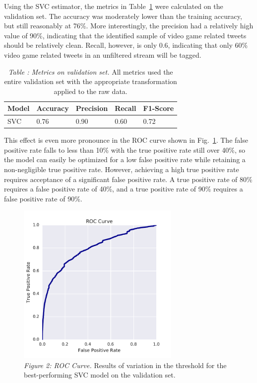 \documentclass[11pt]{revtex4-1}
\newcommand{\figref}[1]{Fig.~\ref{fig:#1}}
\newcommand{\tableref}[1]{Table~\ref{table:#1}}
\begin{document}
Using the SVC estimator, the metrics in \tableref{validation} were
calculated on the validation set.  The accuracy was moderately lower
than the training accuracy, but still reasonably at 76\%.  More
interestingly, the precision had a relatively high value of 90\%,
indicating that the identified sample of video game related tweets
should be relatively clean.  Recall, however, is only 0.6, indicating
that only 60\% video game related tweets in an unfiltered stream will
be tagged.   

\begin{table}
      \begin{tabular}{|l|l|l|l|l|}
        \hline
        Model & Accuracy & Precision & Recall & F1-Score \\
        \hline
        SVC & 0.76 & 0.90 & 0.60 & 0.72 \\
        \hline
      \end{tabular}
    \label{table:validation}
    \caption{\emph{Table : Metrics on validation set.}  All metrics
      used the entire validation set with the appropriate
      transformation applied to the raw data.}
\end{table}

This effect is even more pronounce in the ROC curve shown in
\figref{roc_curve}.  The false positive rate falls to less than 10\%
with the true positive rate still over 40\%, so the model can easily
be optimized for a low false positive rate while retaining a
non-negligible true positive rate.  However, achieving a high true
positive rate requires acceptance of a significant false positive
rate.  A true positive rate of 80\% requires a false positive rate of
40\%, and a true positive rate of 90\% requires a false positive rate
of 90\%.

\begin{figure}[tbh]
  \includegraphics[width=0.7\textwidth]{ROC_Curve.pdf}
  \caption{\emph{Figure 2: ROC Curve.}  Results of variation in the
    threshold for the best-performing SVC model on the validation
    set.}
  \label{fig:roc_curve}
\end{figure}
\end{document}
